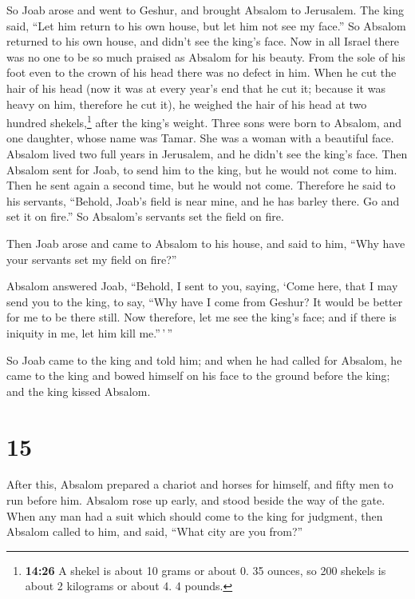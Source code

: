  So Joab arose and went to Geshur, and brought Absalom to
Jerusalem.  The king said, ``Let him return to his own
house, but let him not see my face.'' So Absalom returned to his own
house, and didn't see the king's face.  Now in all Israel
there was no one to be so much praised as Absalom for his beauty. From
the sole of his foot even to the crown of his head there was no defect
in him.  When he cut the hair of his head (now it was at
every year's end that he cut it; because it was heavy on him, therefore
he cut it), he weighed the hair of his head at two hundred
shekels,\footnote{\textbf{14:26} A shekel is about 10 grams or about 0.
  35 ounces, so 200 shekels is about 2 kilograms or about 4. 4 pounds.}
after the king's weight.  Three sons were born to
Absalom, and one daughter, whose name was Tamar. She was a woman with a
beautiful face.  Absalom lived two full years in
Jerusalem, and he didn't see the king's face.  Then
Absalom sent for Joab, to send him to the king, but he would not come to
him. Then he sent again a second time, but he would not come.
 Therefore he said to his servants, ``Behold, Joab's
field is near mine, and he has barley there. Go and set it on fire.'' So
Absalom's servants set the field on fire.

 Then Joab arose and came to Absalom to his house, and
said to him, ``Why have your servants set my field on fire?''

 Absalom answered Joab, ``Behold, I sent to you, saying,
`Come here, that I may send you to the king, to say, ``Why have I come
from Geshur? It would be better for me to be there still. Now therefore,
let me see the king's face; and if there is iniquity in me, let him kill
me.''\,'\,''

 So Joab came to the king and told him; and when he had
called for Absalom, he came to the king and bowed himself on his face to
the ground before the king; and the king kissed Absalom.

\hypertarget{section-14}{%
\section{15}\label{section-14}}

 After this, Absalom prepared a chariot and horses for
himself, and fifty men to run before him.  Absalom rose up
early, and stood beside the way of the gate. When any man had a suit
which should come to the king for judgment, then Absalom called to him,
and said, ``What city are you from?''

